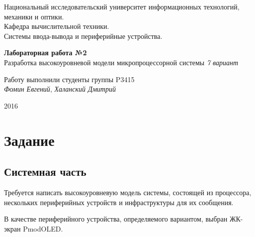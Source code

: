 \documentclass[12pt, a4paper] {ncc}
\begin{document}
\setcounter{figure}{0}
\frenchspacing
\pagestyle{empty}
\begin{center}
     Национальный исследовательский университет информационных технологий,
                              механики и оптики.\\
                       Кафедра вычислительной техники.\\
                Системы ввода-вывода и периферийные устройства.
\end{center}
\begin{center}
                         {\bf Лабораторная работа №2}\\
          Разработка высокоуровневой модели микропроцессорной системы
                                {\sl 7 вариант}
\end{center}
\begin{flushright}
                                        Работу выполнили студенты группы P3415\\
                                                            {\it Фомин Евгений},
                                                         {\it Халанский Дмитрий}
\end{flushright}
\begin{center}
                                      2016
\end{center}
\newpage


\tableofcontents

\section{Задание}

\subsection{Системная часть}

Требуется написать высокоуровневую модель системы, состоящей из процессора,
нескольких периферийных устройств и инфраструктуры для их сообщения.

В качестве периферийного устройства, определяемого вариантом, выбран ЖК-экран
PmodOLED.
\end{document}
